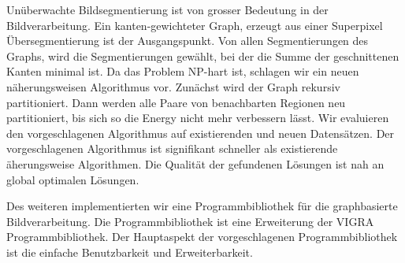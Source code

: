 
Un\"uberwachte Bildsegmentierung
ist von grosser Bedeutung in der Bildverarbeitung.
Ein kanten-gewichteter Graph, erzeugt aus einer
Superpixel \"Ubersegmentierung  ist der Ausgangspunkt.
Von allen Segmentierungen  des Graphs,
wird die Segmentierungen gew\"ahlt,
bei der die Summe der geschnittenen  Kanten
minimal ist.
Da das Problem NP-hart ist, schlagen wir
ein neuen n\"aherungsweisen Algorithmus vor.
Zun\"achst wird der Graph rekursiv partitioniert.
Dann werden alle Paare von benachbarten
Regionen neu partitioniert,
bis sich so die Energy nicht mehr verbessern l\"asst.
Wir evaluieren den vorgeschlagenen Algorithmus
auf existierenden und neuen Datens\"atzen.
Der vorgeschlagenen Algorithmus
ist signifikant schneller als
existierende  \"aherungsweise Algorithmen.
Die Qualit\"at der gefundenen L\"osungen
ist nah an global optimalen L\"osungen.


Des weiteren implementierten  wir eine
Programmbibliothek f\"ur  die graphbasierte  Bildverarbeitung.
Die Programmbibliothek ist eine Erweiterung der VIGRA Programmbibliothek.
Der Hauptaspekt der vorgeschlagenen Programmbibliothek
ist die einfache Benutzbarkeit und Erweiterbarkeit.



\endgroup           

\vfill